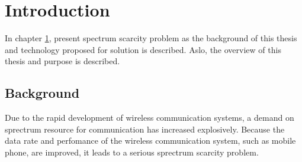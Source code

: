 \chapter[Introduction]{Introduction}
\label{chapter:introduction}

In chapter \ref{chapter:introduction},  present spectrum scarcity problem as the background of this thesis and technology proposed for solution is described. Aslo, the overview of this thesis and purpose is described. 
\section{Background}
 Due to the rapid development of wireless communication systems, a demand on sprectrum resource for communication has increased explosively. Because the data rate and perfomance of the wireless communication system, such as mobile phone, are improved, it leads to a serious sprectrum scarcity problem.

